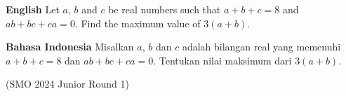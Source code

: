\textbf{English}
Let $a$, $b$ and $c$ be real numbers such that $a + b + c = 8$ and $ab + bc + ca = 0$.
Find the maximum value of $3(a + b)$.

\textbf{Bahasa Indonesia}
Misalkan $a$, $b$ dan $c$ adalah bilangan real yang memenuhi $a + b + c = 8$ dan $ab + bc + ca = 0$.
Tentukan nilai maksimum dari $3(a + b)$.

(SMO 2024 Junior Round 1)

